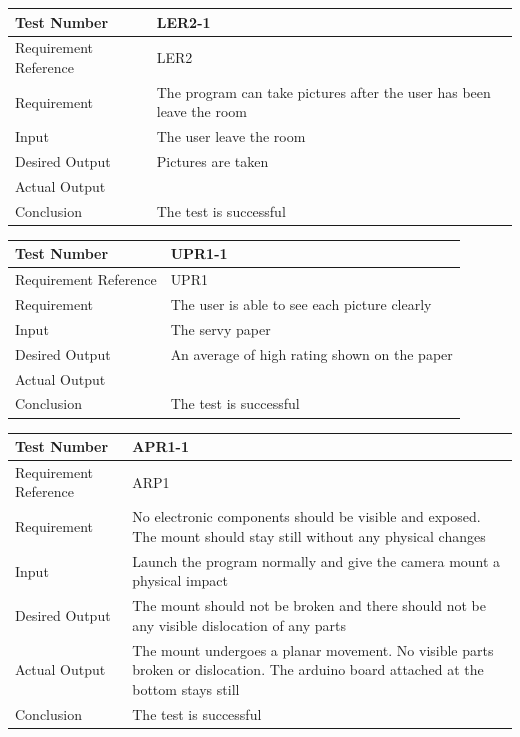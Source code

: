 \documentclass[12pt, titlepage]{article}
\begin{document}
\begin{table}[H]
\begin{center}
\begin{tabular}{|l | m{9cm}|}
\hline
  Test Number & LER2-1\\
  \hline
  Requirement Reference & LER2\\
  \hline
  Requirement & The program can take pictures after the user has been leave the room\\
  \hline
  Input & The user leave the room\\
  \hline
  Desired Output & Pictures are taken\\
  \hline
  Actual Output &\\
  \hline
  Conclusion & The test is successful\\
  \hline
\end{tabular}
\end{center}           
\end{table}

\begin{table}[H]
\begin{center}
\begin{tabular}{|l | m{9cm}|}
\hline
  Test Number & UPR1-1\\
  \hline
  Requirement Reference & UPR1\\
  \hline
  Requirement & The user is able to see each picture clearly\\
  \hline
  Input & The servy paper\\
  \hline
  Desired Output & An average of high rating shown on the paper\\
  \hline
  Actual Output &\\
  \hline
  Conclusion & The test is successful\\
  \hline
\end{tabular}
\end{center}           
\end{table}

\begin{table}[H]
\begin{center}
\begin{tabular}{|l | m{9cm}|}
\hline
  Test Number &  APR1-1 \\
  \hline
  Requirement Reference & ARP1 \\
  \hline
  Requirement & No electronic components should be visible and exposed. The mount should stay still without any physical changes  \\
  \hline
  Input & Launch the program normally and give the camera mount a physical impact \\
  \hline
  Desired Output & The mount should not be broken and there should not be any visible dislocation of any parts\\
  \hline
  Actual Output & The mount undergoes a planar movement. No visible parts broken or dislocation. The arduino board attached at the bottom stays still  \\
  \hline
  Conclusion & The test is successful\\
  \hline
\end{tabular}
\end{center}           
\end{table}
\end{document}
